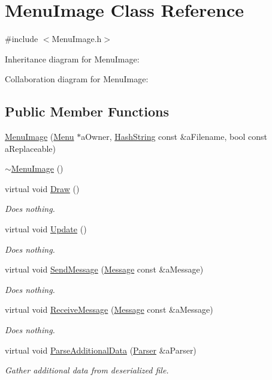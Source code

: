 \hypertarget{classMenuImage}{}\section{Menu\+Image Class Reference}
\label{classMenuImage}


{\ttfamily \#include $<$Menu\+Image.\+h$>$}



Inheritance diagram for Menu\+Image\+:


Collaboration diagram for Menu\+Image\+:
\subsection*{Public Member Functions}
\begin{DoxyCompactItemize}
\item 
\hyperlink{classMenuImage_a02adcb91a8281c0cb32a77e7ff0061c7}{Menu\+Image} (\hyperlink{classMenu}{Menu} $\ast$a\+Owner, \hyperlink{classHashString}{Hash\+String} const \&a\+Filename, bool const a\+Replaceable)
\item 
\hyperlink{classMenuImage_a9802502749a22188b65dfc101f98bd3b}{$\sim$\+Menu\+Image} ()
\item 
virtual void \hyperlink{classMenuImage_afc629a2bde05705f00d26e71319390a8}{Draw} ()
\begin{DoxyCompactList}\small\item\em Does nothing. \end{DoxyCompactList}\item 
virtual void \hyperlink{classMenuImage_a1c54191212d06d40c596f09ec428f361}{Update} ()
\begin{DoxyCompactList}\small\item\em Does nothing. \end{DoxyCompactList}\item 
virtual void \hyperlink{classMenuImage_a595a3402404b28d0fbe9793a3364ffbb}{Send\+Message} (\hyperlink{classMessage}{Message} const \&a\+Message)
\begin{DoxyCompactList}\small\item\em Does nothing. \end{DoxyCompactList}\item 
virtual void \hyperlink{classMenuImage_a9162c043b69171720f75b80717583919}{Receive\+Message} (\hyperlink{classMessage}{Message} const \&a\+Message)
\begin{DoxyCompactList}\small\item\em Does nothing. \end{DoxyCompactList}\item 
virtual void \hyperlink{classMenuImage_ac5ecd63269a18b3a6c2e1c113616122e}{Parse\+Additional\+Data} (\hyperlink{classParser}{Parser} \&a\+Parser)
\begin{DoxyCompactList}\small\item\em Gather additional data from deserialized file. \end{DoxyCompactList}\end{DoxyCompactItemize}
